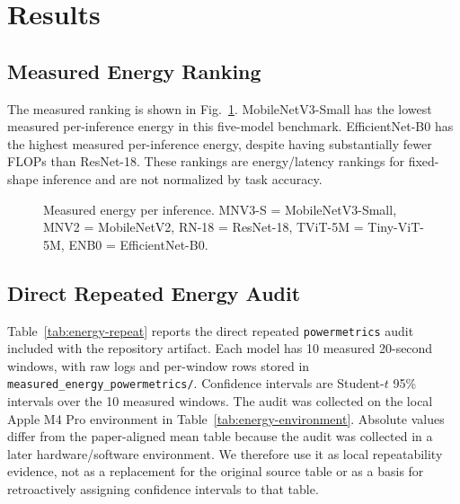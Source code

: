 \documentclass[conference]{IEEEtran}
\begin{document}
\section{Results}

\subsection{Measured Energy Ranking}
The measured ranking is shown in Fig.~\ref{fig:measured-energy}.
MobileNetV3-Small has the lowest measured per-inference energy in this
five-model benchmark. EfficientNet-B0 has the highest measured per-inference
energy, despite having substantially fewer FLOPs than ResNet-18. These
rankings are energy/latency rankings for fixed-shape inference and are not
normalized by task accuracy.

\begin{figure}[ht]
\centering
{}
\caption{Measured energy per inference. MNV3-S = MobileNetV3-Small, MNV2 = MobileNetV2, RN-18 = ResNet-18, TViT-5M = Tiny-ViT-5M, ENB0 = EfficientNet-B0.}
\label{fig:measured-energy}
\end{figure}

\subsection{Direct Repeated Energy Audit}
Table~\ref{tab:energy-repeat} reports the direct repeated
\texttt{powermetrics} audit included with the repository artifact. Each model
has 10 measured 20-second windows, with raw logs and per-window rows stored in
\texttt{measured\_energy\_powermetrics/}. Confidence intervals are
Student-$t$ 95\% intervals over the 10 measured windows. The audit was
collected on the local Apple M4 Pro environment in
Table~\ref{tab:energy-environment}. Absolute values differ from the
paper-aligned mean table because the audit was collected in a later
hardware/software environment. We therefore use it as local repeatability
evidence, not as a replacement for the original source table or as a basis for
retroactively assigning confidence intervals to that table.
\end{document}
